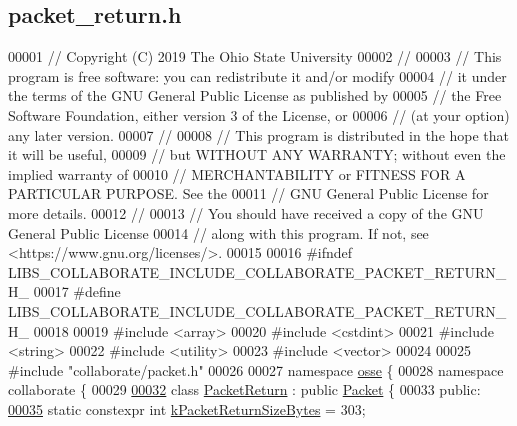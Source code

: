 \hypertarget{packet__return_8h_source}{}\subsection{packet\+\_\+return.\+h}
\label{packet__return_8h_source}

\begin{DoxyCode}
00001 \textcolor{comment}{// Copyright (C) 2019 The Ohio State University}
00002 \textcolor{comment}{//}
00003 \textcolor{comment}{// This program is free software: you can redistribute it and/or modify}
00004 \textcolor{comment}{// it under the terms of the GNU General Public License as published by}
00005 \textcolor{comment}{// the Free Software Foundation, either version 3 of the License, or}
00006 \textcolor{comment}{// (at your option) any later version.}
00007 \textcolor{comment}{//}
00008 \textcolor{comment}{// This program is distributed in the hope that it will be useful,}
00009 \textcolor{comment}{// but WITHOUT ANY WARRANTY; without even the implied warranty of}
00010 \textcolor{comment}{// MERCHANTABILITY or FITNESS FOR A PARTICULAR PURPOSE.  See the}
00011 \textcolor{comment}{// GNU General Public License for more details.}
00012 \textcolor{comment}{//}
00013 \textcolor{comment}{// You should have received a copy of the GNU General Public License}
00014 \textcolor{comment}{// along with this program.  If not, see <https://www.gnu.org/licenses/>.}
00015 
00016 \textcolor{preprocessor}{#ifndef LIBS\_COLLABORATE\_INCLUDE\_COLLABORATE\_PACKET\_RETURN\_H\_}
00017 \textcolor{preprocessor}{#define LIBS\_COLLABORATE\_INCLUDE\_COLLABORATE\_PACKET\_RETURN\_H\_}
00018 
00019 \textcolor{preprocessor}{#include <array>}
00020 \textcolor{preprocessor}{#include <cstdint>}
00021 \textcolor{preprocessor}{#include <string>}
00022 \textcolor{preprocessor}{#include <utility>}
00023 \textcolor{preprocessor}{#include <vector>}
00024 
00025 \textcolor{preprocessor}{#include "collaborate/packet.h"}
00026 
00027 \textcolor{keyword}{namespace }\hyperlink{namespaceosse}{osse} \{
00028 \textcolor{keyword}{namespace }collaborate \{
00029 
\hyperlink{classosse_1_1collaborate_1_1_packet_return}{00032} \textcolor{keyword}{class }\hyperlink{classosse_1_1collaborate_1_1_packet_return}{PacketReturn} : \textcolor{keyword}{public} \hyperlink{classosse_1_1collaborate_1_1_packet}{Packet} \{
00033  \textcolor{keyword}{public}:
\hyperlink{classosse_1_1collaborate_1_1_packet_return_ac4c8213599bd47f85d83b85f27e2d24a}{00035}   \textcolor{keyword}{static} constexpr \textcolor{keywordtype}{int} \hyperlink{classosse_1_1collaborate_1_1_packet_return_ac4c8213599bd47f85d83b85f27e2d24a}{kPacketReturnSizeBytes} = 303;

\end{DoxyCode}
